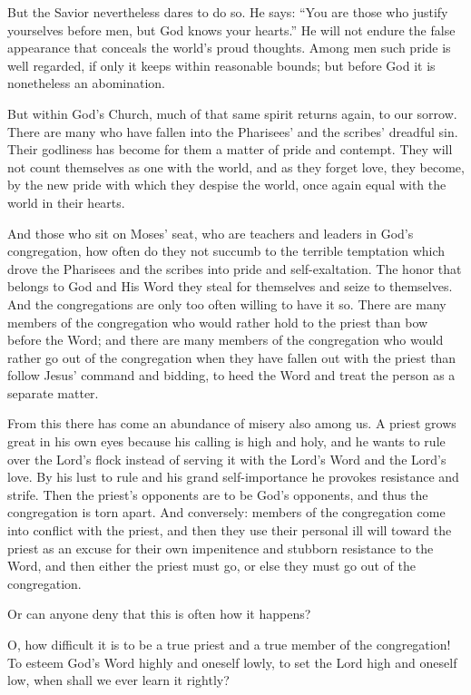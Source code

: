 But the Savior nevertheless dares to do so. He says: “You are those who justify yourselves before men, but God knows your hearts.” He will not endure the false appearance that conceals the world’s proud thoughts. Among men such pride is well regarded, if only it keeps within reasonable bounds; but before God it is nonetheless an abomination.

But within God’s Church, much of that same spirit returns again, to our sorrow. There are many who have fallen into the Pharisees’ and the scribes’ dreadful sin. Their godliness has become for them a matter of pride and contempt. They will not count themselves as one with the world, and as they forget love, they become, by the new pride with which they despise the world, once again equal with the world in their hearts.

And those who sit on Moses’ seat, who are teachers and leaders in God’s congregation, how often do they not succumb to the terrible temptation which drove the Pharisees and the scribes into pride and self-exaltation. The honor that belongs to God and His Word they steal for themselves and seize to themselves. And the congregations are only too often willing to have it so. There are many members of the congregation who would rather hold to the priest than bow before the Word; and there are many members of the congregation who would rather go out of the congregation when they have fallen out with the priest than follow Jesus’ command and bidding, to heed the Word and treat the person as a separate matter.

From this there has come an abundance of misery also among us. A priest grows great in his own eyes because his calling is high and holy, and he wants to rule over the Lord’s flock instead of serving it with the Lord’s Word and the Lord’s love. By his lust to rule and his grand self-importance he provokes resistance and strife. Then the priest’s opponents are to be God’s opponents, and thus the congregation is torn apart. And conversely: members of the congregation come into conflict with the priest, and then they use their personal ill will toward the priest as an excuse for their own impenitence and stubborn resistance to the Word, and then either the priest must go, or else they must go out of the congregation.

Or can anyone deny that this is often how it happens?

O, how difficult it is to be a true priest and a true member of the congregation! To esteem God’s Word highly and oneself lowly, to set the Lord high and oneself low, when shall we ever learn it rightly?

